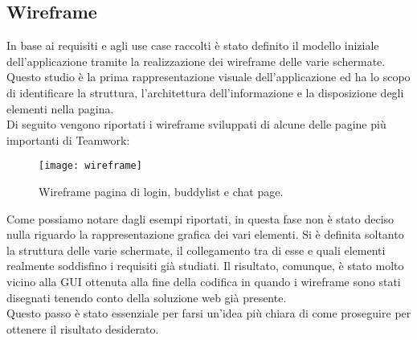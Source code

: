 \subsection{Wireframe}
In base ai requisiti e agli use case raccolti è stato definito il modello iniziale
 dell'applicazione tramite la realizzazione dei wireframe delle varie schermate. \\
Questo studio è la prima rappresentazione visuale dell'applicazione ed ha lo 
scopo di identificare la struttura, l'architettura dell'informazione e la 
disposizione degli elementi nella pagina.\\
Di seguito vengono riportati i wireframe sviluppati di alcune delle pagine più 
importanti di Teamwork:
\begin{figure}[H] 
	\centering
	\texttt{[image: wireframe]}
	\caption{Wireframe pagina di login, buddylist e chat page.}
\end{figure}
Come possiamo notare dagli esempi riportati, in questa fase non è stato deciso 
nulla riguardo la rappresentazione grafica dei vari elementi. 
Si è definita soltanto la struttura delle varie schermate, il collegamento tra 
di esse e quali elementi realmente soddisfino i requisiti già studiati. 
Il risultato, comunque, è stato molto vicino alla GUI ottenuta alla fine della 
codifica in quando i wireframe sono stati disegnati tenendo conto della 
soluzione web già presente.\\ 
Questo passo è stato essenziale per farsi un'idea più chiara di come proseguire 
per ottenere il risultato desiderato.

